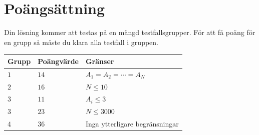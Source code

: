 \section*{Poängsättning}
Din lösning kommer att testas på en mängd testfallsgrupper.
För att få poäng för en grupp så måste du klara alla testfall i gruppen.

\noindent
\begin{tabular}{| l | l | p{12cm} |}
  \hline
  Grupp & Poängvärde & Gränser \\ \hline
  $1$   & $14$       & $A_1 = A_2 = \cdots = A_N$\\ \hline
  $2$   & $16$       & $N \leq 10$  \\ \hline
  $3$   & $11$       & $A_i \leq 3$ \\ \hline
  $3$   & $23$       & $N \leq 3000$ \\ \hline
  $4$   & $36$       & Inga ytterligare begränsningar \\ \hline
\end{tabular}
